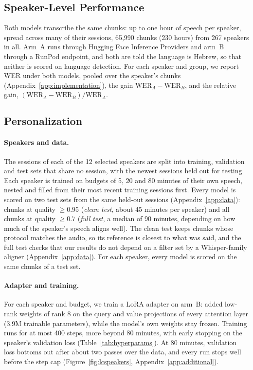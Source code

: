 \documentclass[11pt]{article}
\begin{document}
\subsection{Speaker-Level Performance}

Both models transcribe the same chunks: up to one hour of speech per speaker, spread across
many of their sessions, 65{,}990 chunks
(230 hours) from 267 speakers in all. Arm~A runs through Hugging Face Inference
Providers and arm~B through a RunPod endpoint, and both are told the language is Hebrew, so that neither is scored
on language detection. For each speaker and
group, we report WER under both models, pooled
over the speaker's chunks (Appendix~\ref{app:implementation}), the gain
$\text{WER}_A-\text{WER}_B$, and the relative gain,
$(\text{WER}_A-\text{WER}_B)/\text{WER}_A$.

\subsection{Personalization}
\label{sec:personalization}

\paragraph{Speakers and data.}
The sessions of each of the 12 selected speakers are split into training,
validation and test sets that share no session, with the newest sessions held
out for testing. Each speaker is trained on budgets of 5,
20 and 80 minutes of their own speech, nested and filled from their most recent
training sessions first.  Every model is scored on two test sets from the
same held-out sessions (Appendix~\ref{app:data}): chunks at quality $\geq 0.95$
(\emph{clean test}, about 45 minutes per speaker) and all chunks at quality
$\geq 0.7$ (\emph{full test}, a median of 90 minutes, depending on how much of the
speaker's speech aligns well). The clean test keeps chunks whose protocol
matches the audio, so its reference is closest to what was said, and the full
test checks that our results do not depend on a filter set by a Whisper-family
aligner (Appendix~\ref{app:data}). For each speaker, every model is scored on the
same chunks of a test set.

\paragraph{Adapter and training.}
For each
speaker and budget, we train a LoRA adapter \citep{hu2022lora} on arm~B: added
low-rank weights of rank 8 on the query and value projections of every attention
layer (3.9M trainable parameters), while the model's own weights stay frozen.  Training runs for at most 400 steps,
more beyond 80 minutes, with early stopping on the speaker's validation loss (Table~\ref{tab:hyperparams}).  At 80 minutes,
validation loss bottoms out after about two passes over the data, and every run
stops well before the step cap (Figure~\ref{fig:lcspeakers},
Appendix~\ref{app:additional}). 
\end{document}
